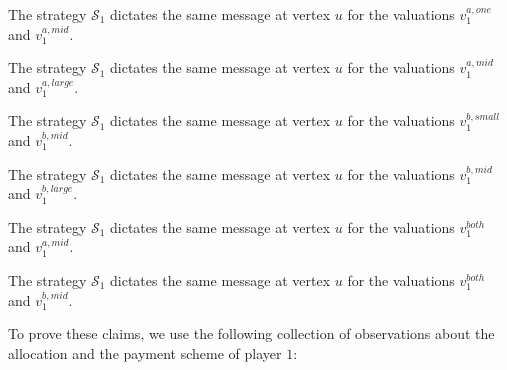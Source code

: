 \begin{claim}\label{claim-a-one-mid}
    The strategy $\mathcal S_1$ dictates the same message at vertex $u$ for the valuations $v_1^{a,one}$ and $v_1^{a,mid}$. 
\end{claim}
\begin{claim}\label{claim-a-mid-large}
    The strategy $\mathcal S_1$ dictates the same message at vertex $u$ for the valuations $v_1^{a,mid}$ and $v_1^{a,large}$. 
\end{claim}
\begin{claim}\label{claim-b-small-large}
    The strategy $\mathcal S_1$ dictates the same message at vertex $u$ for the valuations $v_1^{b,small}$ and $v_1^{b,mid}$. 
\end{claim}
\begin{claim}\label{claim-b-mid-large}
    The strategy $\mathcal S_1$ dictates the same message at vertex $u$ for the valuations $v_1^{b,mid}$ and $v_1^{b,large}$. 
\end{claim}
\begin{claim}\label{claim-a-both}
    The strategy $\mathcal S_1$ dictates the same message at vertex $u$ for the valuations $v_1^{both}$ and $v_1^{a,mid}$. 
\end{claim}
\begin{claim}\label{claim-b-both}
    The strategy $\mathcal S_1$ dictates the same message at vertex $u$ for the valuations $v_1^{both}$ and $v_1^{b,mid}$. 
\end{claim}
To prove these claims, we use the following collection of observations about the allocation and the payment scheme of player $1$:    
